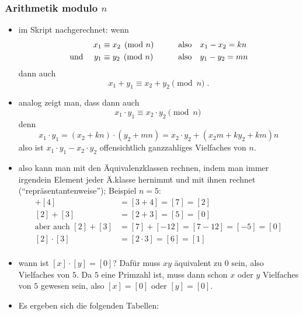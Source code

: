 \begin{tutorium}
  \subsubsection*{Arithmetik modulo $n$}
  \begin{itemize}
  \item im Skript nachgerechnet: wenn
    \begin{alignat*}{2}
      x_1&\equiv x_2 \pmod n &\qquad& \text{also\quad} x_1-x_2 = k n\\
      \text{und \quad} y_1&\equiv y_2 \pmod n && \text{also\quad} y_1-y_2 = m n
    \end{alignat*}
    dann auch
    \[
    x_1+y_1 \equiv x_2+y_2 \pmod n \;.
    \]
  \item analog zeigt man, dass dann auch 
    \[
    x_1\cdot y_1 \equiv x_2\cdot y_2 \pmod n \
    \]
    denn
    \[
    x_1\cdot y_1 =(x_2+kn)\cdot (y_2+mn)=x_2\cdot y_2 + (x_2m+ky_2+km)n
    \]
    also ist $x_1\cdot y_1 - x_2\cdot y_2$ offensichtlich ganzzahliges
    Vielfaches von $n$.
  \item also kann man mit den Äquivalenzklassen rechnen, indem man
    immer irgendein Element jeder Ä.klasse hernimmt und mit ihnen
    rechnet ("`repräsentantenweise"'); Beispiel $n=5$:
    \begin{align*}
      [3]+[4] &= [3+4] = [7] = [2] \\
      [2]+[3] &= [2+3] = [5] = [0] \\
      \text{aber auch } [2]+[3] &= [7]+[-12] = [7-12] = [-5] = [0] \\
      [2]\cdot[3] &= [2\cdot3] = [6] = [1]\\
    \end{align*}
  \item wann ist $[x]\cdot[y]=[0]$? Dafür muss $xy$ äquivalent zu $0$
    sein, also Vielfaches von $5$. Da $5$ eine Primzahl ist, muss dann
    schon $x$ oder $y$ Vielfaches von $5$ gewesen sein, also $[x]=[0]$
    oder $[y]=[0]$.
  \item Es ergeben sich die folgenden Tabellen:


\end{itemize}
\end{tutorium}
